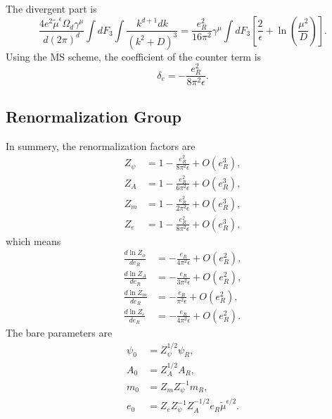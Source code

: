 The divergent part is
\begin{equation*}
	\frac{4 e^2\tilde{\mu}^{\epsilon} \Omega_d \gamma^\mu}{d(2\pi)^d}\int dF_3 \int \frac{k^{d+1}dk}{(k^2+D)^3}
	= \frac{e_R^2}{16\pi^2} \gamma^\mu \int dF_3 \left[\frac{2}{\epsilon}+\ln\left(\frac{\mu^2}{D}\right)\right].
\end{equation*}
Using the $\overline{\mathrm{MS}}$ scheme, the coefficient of the counter term is
\begin{equation}
	\delta_e = -\frac{e_R^2}{8\pi^2\epsilon}.
\end{equation}


\subsection{Renormalization Group}
In summery, the renormalization factors are
\begin{equation}
\begin{aligned}
	Z_\psi &= 1 -\frac{e_R^2}{8\pi^2\epsilon} + O(e_R^3), \\
	Z_A &= 1 - \frac{e_R^2}{6\pi^2 \epsilon} + O(e_R^3), \\
	Z_m &= 1 - \frac{e_R^2}{2\pi^2\epsilon} + O(e_R^3), \\
	Z_e &= 1 - \frac{e_R^2}{8\pi^2\epsilon} + O(e_R^3),
\end{aligned}
\end{equation}
which means
\begin{equation}
\begin{aligned}
	\frac{d\ln Z_\phi}{d e_R} &= -\frac{e_R}{4\pi^2 \epsilon} + O(e_R^2), \\
	\frac{d\ln Z_A}{d e_R} &= -\frac{e_R}{3\pi^2 \epsilon} + O(e_R^2), \\
	\frac{d\ln Z_m}{d e_R} &= -\frac{e_R}{\pi^2 \epsilon} + O(e_R^2), \\
	\frac{d\ln Z_e}{d e_R} &= -\frac{e_R}{4\pi^2 \epsilon} + O(e_R^2).
\end{aligned}
\end{equation}
The bare parameters are
\begin{equation}
\begin{aligned}
	\psi_0 &= Z_\psi^{1/2}\psi_R, \\
	A_0 &= Z_A^{1/2} A_R, \\
	m_0 &= Z_m Z_\psi^{-1} m_R, \\
	e_0 &= Z_e Z_\psi^{-1} Z_A^{-1/2} e_R \tilde{\mu}^{\epsilon/2}. 
\end{aligned}
\end{equation}
